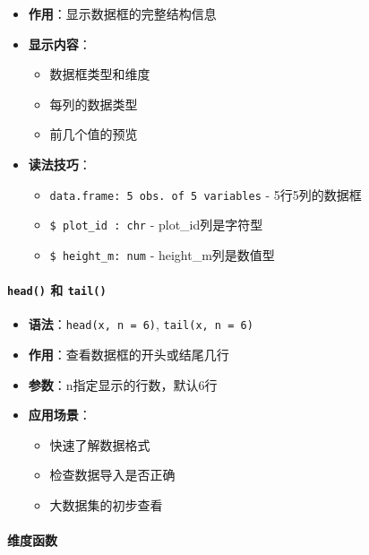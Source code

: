 \documentclass[
]{book}
\providecommand{\tightlist}{%
  \setlength{\itemsep}{0pt}\setlength{\parskip}{0pt}}
\begin{document}
\begin{itemize}
\tightlist
\item
  \textbf{作用}：显示数据框的完整结构信息
\item
  \textbf{显示内容}：

  \begin{itemize}
  \tightlist
  \item
    数据框类型和维度
  \item
    每列的数据类型
  \item
    前几个值的预览
  \end{itemize}
\item
  \textbf{读法技巧}：

  \begin{itemize}
  \tightlist
  \item
    \texttt{\textquotesingle{}data.frame\textquotesingle{}:\ 5\ obs.\ of\ 5\ variables} - 5行5列的数据框
  \item
    \texttt{\$\ plot\_id\ :\ chr} - plot\_id列是字符型
  \item
    \texttt{\$\ height\_m:\ num} - height\_m列是数值型
  \end{itemize}
\end{itemize}

\hypertarget{head-ux548c-tail}{%
\paragraph{\texorpdfstring{\texttt{head()} 和 \texttt{tail()}}{head() 和 tail()}}\label{head-ux548c-tail}}

\begin{itemize}
\tightlist
\item
  \textbf{语法}：\texttt{head(x,\ n\ =\ 6)}, \texttt{tail(x,\ n\ =\ 6)}
\item
  \textbf{作用}：查看数据框的开头或结尾几行
\item
  \textbf{参数}：n指定显示的行数，默认6行
\item
  \textbf{应用场景}：

  \begin{itemize}
  \tightlist
  \item
    快速了解数据格式
  \item
    检查数据导入是否正确
  \item
    大数据集的初步查看
  \end{itemize}
\end{itemize}

\hypertarget{ux7ef4ux5ea6ux51fdux6570}{%
\paragraph{维度函数}\label{ux7ef4ux5ea6ux51fdux6570}}
\end{document}
